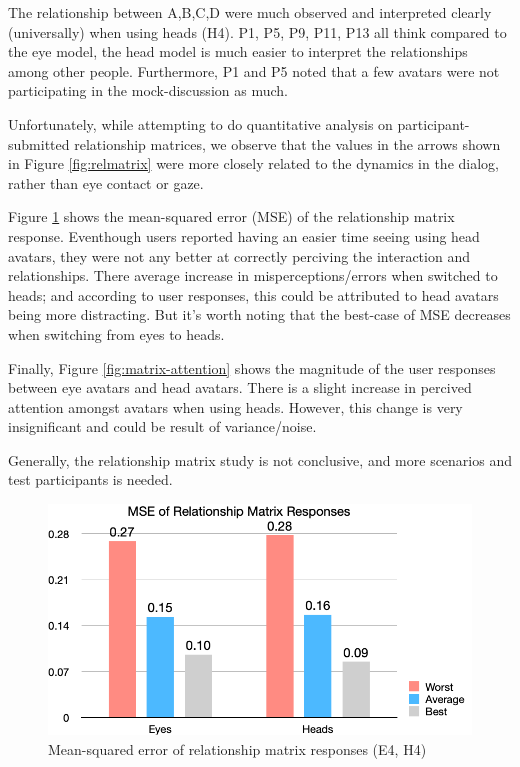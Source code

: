 
The relationship between A,B,C,D were much observed and interpreted clearly (universally) when using heads (H4).
P1, P5, P9, P11, P13 all think compared to the eye model, the head model is much easier to interpret the relationships among other people.
Furthermore, P1 and P5 noted that a few avatars were not participating in the mock-discussion as much.

Unfortunately, while attempting to do quantitative analysis on participant-submitted relationship matrices, we observe that the values in the arrows shown in Figure \ref{fig:relmatrix} were more
closely related to the dynamics in the dialog, rather than eye contact or gaze.

Figure \ref{fig:matrix-mse} shows the mean-squared error (MSE) of the relationship matrix response.
Eventhough users reported having an easier time
seeing using head avatars, they were not any better at correctly perciving the interaction and relationships.
There average increase in misperceptions/errors when switched to heads; and according to user responses,
this could be attributed to head avatars being more distracting.
But it's worth noting that the best-case of MSE decreases when switching from eyes to heads.

Finally, Figure \ref{fig:matrix-attention} shows the magnitude of the user responses between eye avatars and head avatars.
There is a slight increase in percived attention amongst avatars when using heads.
However, this change is very insignificant and could be result of variance/noise.

Generally, the relationship matrix study is not conclusive, and more scenarios and test participants is needed.

\begin{figure}
	\centering
 	\includegraphics[width=\textwidth]{matrix-mse.png}
	\caption{Mean-squared error of relationship matrix responses (E4, H4)}
	\label{fig:matrix-mse}
\end{figure}

